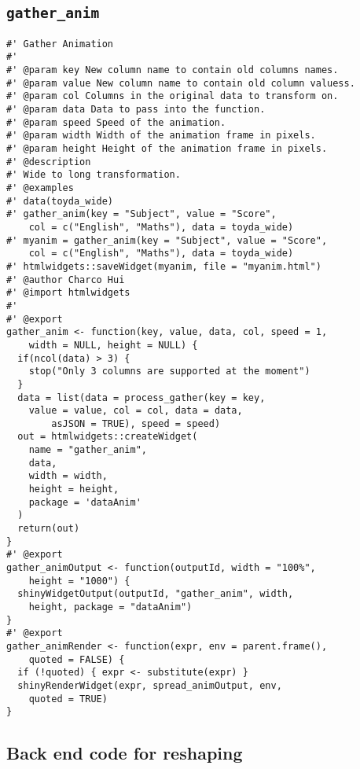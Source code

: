 \subsection{\texttt{gather\_anim}}

\begin{lstlisting}
#' Gather Animation
#'
#' @param key New column name to contain old columns names.
#' @param value New column name to contain old column valuess.
#' @param col Columns in the original data to transform on.
#' @param data Data to pass into the function.
#' @param speed Speed of the animation.
#' @param width Width of the animation frame in pixels.
#' @param height Height of the animation frame in pixels.
#' @description
#' Wide to long transformation.
#' @examples
#' data(toyda_wide)
#' gather_anim(key = "Subject", value = "Score", 
    col = c("English", "Maths"), data = toyda_wide)
#' myanim = gather_anim(key = "Subject", value = "Score", 
    col = c("English", "Maths"), data = toyda_wide)
#' htmlwidgets::saveWidget(myanim, file = "myanim.html")
#' @author Charco Hui
#' @import htmlwidgets
#'
#' @export
gather_anim <- function(key, value, data, col, speed = 1, 
    width = NULL, height = NULL) {
  if(ncol(data) > 3) {
    stop("Only 3 columns are supported at the moment")
  }
  data = list(data = process_gather(key = key, 
    value = value, col = col, data = data, 
        asJSON = TRUE), speed = speed)
  out = htmlwidgets::createWidget(
    name = "gather_anim",
    data,
    width = width,
    height = height,
    package = 'dataAnim'
  )
  return(out)
}
#' @export
gather_animOutput <- function(outputId, width = "100%",
    height = "1000") {
  shinyWidgetOutput(outputId, "gather_anim", width, 
    height, package = "dataAnim")
}
#' @export
gather_animRender <- function(expr, env = parent.frame(), 
    quoted = FALSE) {
  if (!quoted) { expr <- substitute(expr) }
  shinyRenderWidget(expr, spread_animOutput, env, 
    quoted = TRUE)
}
\end{lstlisting}

\subsection{Back end code for reshaping}


